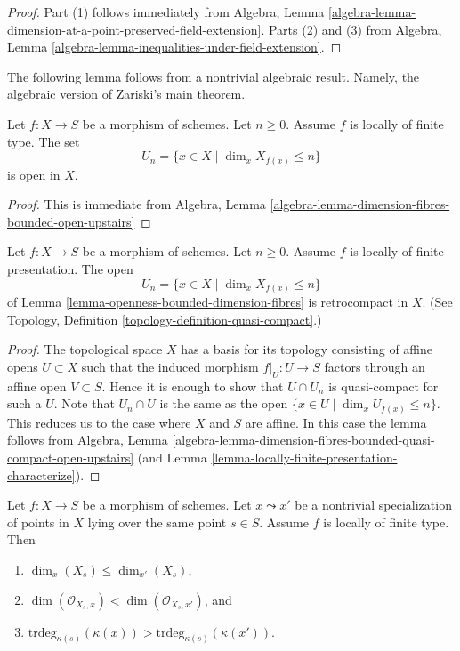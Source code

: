 \begin{proof}
Part (1) follows immediately from
Algebra,
Lemma \ref{algebra-lemma-dimension-at-a-point-preserved-field-extension}.
Parts (2) and (3) from
Algebra, Lemma \ref{algebra-lemma-inequalities-under-field-extension}.
\end{proof}

\noindent
The following lemma follows from a nontrivial algebraic result.
Namely, the algebraic version of Zariski's main theorem.

\begin{lemma}
\label{lemma-openness-bounded-dimension-fibres}
\begin{reference}
\cite[IV Theorem 13.1.3]{EGA}
\end{reference}
Let $f : X \to S$ be a morphism of schemes.
Let $n \geq 0$. Assume $f$ is locally of finite type.
The set
$$
U_n = \{x \in X \mid \dim_x X_{f(x)} \leq n\}
$$
is open in $X$.
\end{lemma}

\begin{proof}
This is immediate from
Algebra,
Lemma \ref{algebra-lemma-dimension-fibres-bounded-open-upstairs}
\end{proof}

\begin{lemma}
\label{lemma-openness-bounded-dimension-fibres-finite-presentation}
Let $f : X \to S$ be a morphism of schemes.
Let $n \geq 0$. Assume $f$ is locally of finite presentation.
The open
$$
U_n = \{x \in X \mid \dim_x X_{f(x)} \leq n\}
$$
of Lemma \ref{lemma-openness-bounded-dimension-fibres} is retrocompact
in $X$. (See Topology, Definition \ref{topology-definition-quasi-compact}.)
\end{lemma}

\begin{proof}
The topological space $X$ has a basis for its topology consisting of
affine opens $U \subset X$ such that the induced morphism
$f|_U : U \to S$ factors through an affine open $V \subset S$. Hence
it is enough to show that $U \cap U_n$ is quasi-compact for such a $U$.
Note that $U_n \cap U$ is the same as the open
$\{x \in U \mid \dim_x U_{f(x)} \leq n\}$. This reduces us to the case
where $X$ and $S$ are affine. In this case the lemma follows from
Algebra,
Lemma \ref{algebra-lemma-dimension-fibres-bounded-quasi-compact-open-upstairs}
(and Lemma \ref{lemma-locally-finite-presentation-characterize}).
\end{proof}

\begin{lemma}
\label{lemma-dimension-fibre-specialization}
Let $f : X \to S$ be a morphism of schemes.
Let $x \leadsto x'$ be a nontrivial specialization of points in $X$
lying over the same point $s \in S$. Assume $f$ is locally of finite type.
Then
\begin{enumerate}
\item $\dim_x(X_s) \leq \dim_{x'}(X_s)$,
\item $\dim(\mathcal{O}_{X_s, x}) < \dim(\mathcal{O}_{X_s, x'})$, and
\item $\text{trdeg}_{\kappa(s)}(\kappa(x)) >
\text{trdeg}_{\kappa(s)}(\kappa(x'))$.
\end{enumerate}
\end{lemma}

